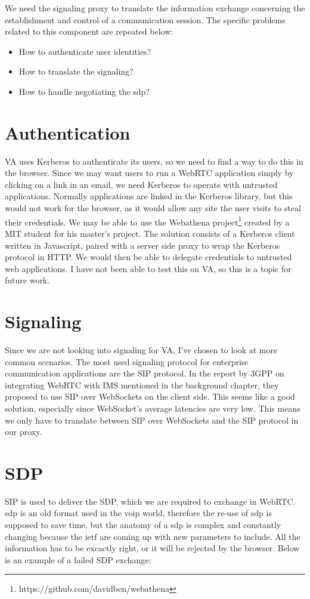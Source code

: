 We need the signaling proxy to translate the information exchange concerning the establishment and control of a communication session. The specific problems related to this component are repeated below:

\begin{itemize}
\item{How to authenticate user identities?}
\item{How to translate the signaling?}
\item{How to handle negotiating the \gls{sdp}?}
\end{itemize}

\section{Authentication}
VA uses Kerberos to authenticate its users, so we need to find a way to do this in the browser. Since we may want users to run a WebRTC application simply by clicking on a link in an email, we need Kerberos to operate with untrusted applications. Normally applications are linked in the Kerberos library, but this would not work for the browser, as it would allow any site the user visits to steal their credentials\cite{webathena}. We may be able to use the Webathena project\footnote{https://github.com/davidben/webathena} created by a MIT student for his master's project\cite{webathena}. The solution consists of a Kerberos client written in Javascript, paired with a server side proxy to wrap the Kerberos protocol in HTTP. We would then be able to delegate credentials to untrusted web applications. I have not been able to test this on VA, so this is a topic for future work.

\section{Signaling}
Since we are not looking into signaling for VA, I've chosen to look at more common scenarios. The most used signaling protocol for enterprise communication applications are the SIP protocol. In the report by 3GPP\cite{3gpp-wrtc-access-ims} on integrating WebRTC with IMS mentioned in the background chapter, they proposed to use SIP over WebSockets on the client side. This seems like a good solution, especially since WebSocket's average latencies are very low\cite{websocket-overhead}. This means we only have to translate between SIP over WebSockets and the SIP protocol in our proxy.

\section{SDP}
SIP is used to deliver the SDP, which we are required to exchange in WebRTC. \gls{sdp} is an old format used in the \gls{voip} world, therefore the re-use of \gls{sdp} is supposed to save time, but the anatomy of a \gls{sdp} is complex and constantly changing because the \gls{ietf} are coming up with new parameters to include. All the information has to be excactly right, or it will be rejected by the browser. Below is an example of a failed SDP exchange:


